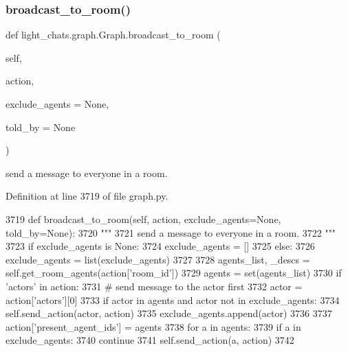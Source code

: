 \subsubsection{\texorpdfstring{broadcast\+\_\+to\+\_\+room()}{broadcast\_to\_room()}}
{\footnotesize\ttfamily def light\+\_\+chats.\+graph.\+Graph.\+broadcast\+\_\+to\+\_\+room (\begin{DoxyParamCaption}\item[{}]{self,  }\item[{}]{action,  }\item[{}]{exclude\+\_\+agents = {\ttfamily None},  }\item[{}]{told\+\_\+by = {\ttfamily None} }\end{DoxyParamCaption})}

\begin{DoxyVerb}send a message to everyone in a room.
\end{DoxyVerb}
 

Definition at line 3719 of file graph.\+py.


\begin{DoxyCode}
3719     \textcolor{keyword}{def }broadcast\_to\_room(self, action, exclude\_agents=None, told\_by=None):
3720         \textcolor{stringliteral}{"""}
3721 \textcolor{stringliteral}{        send a message to everyone in a room.}
3722 \textcolor{stringliteral}{        """}
3723         \textcolor{keywordflow}{if} exclude\_agents \textcolor{keywordflow}{is} \textcolor{keywordtype}{None}:
3724             exclude\_agents = []
3725         \textcolor{keywordflow}{else}:
3726             exclude\_agents = list(exclude\_agents)
3727 
3728         agents\_list, \_descs = self.get\_room\_agents(action[\textcolor{stringliteral}{'room\_id'}])
3729         agents = set(agents\_list)
3730         \textcolor{keywordflow}{if} \textcolor{stringliteral}{'actors'} \textcolor{keywordflow}{in} action:
3731             \textcolor{comment}{# send message to the actor first}
3732             actor = action[\textcolor{stringliteral}{'actors'}][0]
3733             \textcolor{keywordflow}{if} actor \textcolor{keywordflow}{in} agents \textcolor{keywordflow}{and} actor \textcolor{keywordflow}{not} \textcolor{keywordflow}{in} exclude\_agents:
3734                 self.send\_action(actor, action)
3735                 exclude\_agents.append(actor)
3736 
3737         action[\textcolor{stringliteral}{'present\_agent\_ids'}] = agents
3738         \textcolor{keywordflow}{for} a \textcolor{keywordflow}{in} agents:
3739             \textcolor{keywordflow}{if} a \textcolor{keywordflow}{in} exclude\_agents:
3740                 \textcolor{keywordflow}{continue}
3741             self.send\_action(a, action)
3742 
\end{DoxyCode}
\mbox{\label{classlight__chats_1_1graph_1_1Graph_af644853db532d4cfa276a884f04c8544}} 
